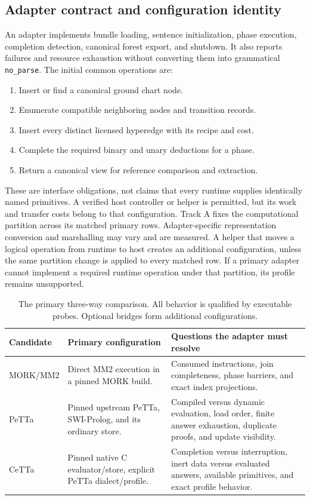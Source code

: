 \documentclass[11pt,a4paper]{article}
\newcommand{\code}[1]{\texttt{#1}}
\begin{document}
\subsection{Adapter contract and configuration identity}
An adapter implements bundle loading, sentence initialization, phase
execution, completion detection, canonical forest export, and shutdown.
It also reports failures and resource exhaustion without converting them
into grammatical \code{no\_parse}. The initial common operations are:
\begin{enumerate}
  \item Insert or find a canonical ground chart node.
  \item Enumerate compatible neighboring nodes and transition records.
  \item Insert every distinct licensed hyperedge with its recipe and cost.
  \item Complete the required binary and unary deductions for a phase.
  \item Return a canonical view for reference comparison and extraction.
\end{enumerate}
These are interface obligations, not claims that every runtime supplies
identically named primitives. A verified host controller or helper is
permitted, but its work and transfer costs belong to that configuration.
Track A fixes the computational partition across its matched primary rows.
Adapter-specific representation conversion and marshalling may vary and are
measured. A helper that moves a logical operation from runtime to host
creates an additional configuration, unless the same partition change is
applied to every matched row. If a primary adapter cannot implement a required
runtime operation under that partition, its profile remains unsupported.

\begin{table}[htbp]
\small
\begin{tabularx}{\textwidth}{L{25mm}YY}
\toprule
Candidate & Primary configuration & Questions the adapter must resolve \\
\midrule
MORK/MM2 & Direct MM2 execution in a pinned MORK build. &
Consumed instructions, join completeness, phase barriers, and exact
index projections. \\
PeTTa & Pinned upstream PeTTa, SWI-Prolog, and its ordinary store. &
Compiled versus dynamic evaluation, load order, finite answer exhaustion,
duplicate proofs, and update visibility. \\
CeTTa & Pinned native C evaluator/store, explicit PeTTa dialect/profile. &
Completion versus interruption, inert data versus evaluated answers,
available primitives, and exact profile behavior. \\
\bottomrule
\end{tabularx}
\caption{The primary three-way comparison. All behavior is qualified by
executable probes. Optional bridges form additional configurations.}
\end{table}
\end{document}
